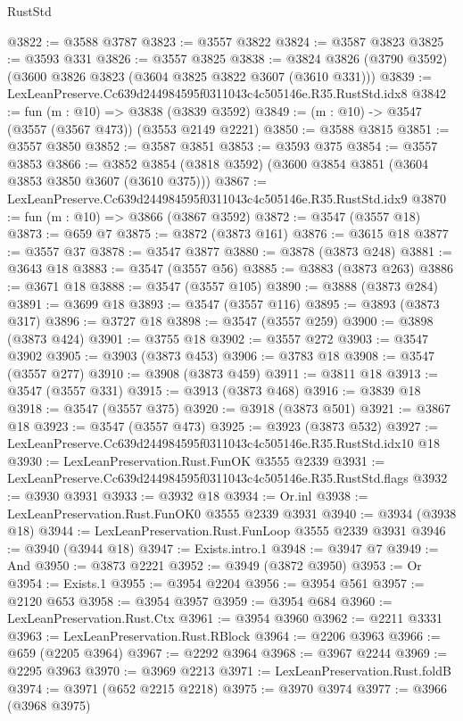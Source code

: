 \begin{lexlean}{RustStd}
\begin{coremodule}
@3822 := @3588 @3787
@3823 := @3557 @3822
@3824 := @3587 @3823
@3825 := @3593 @331
@3826 := @3557 @3825
@3838 := @3824 @3826 (@3790 @3592) (@3600 @3826 @3823 (@3604 @3825 @3822 @3607 (@3610 @331)))
@3839 := LexLeanPreserve.Cc639d244984595f0311043c4c505146e.R35.RustStd.idx8
@3842 := fun (m : @10) => @3838 (@3839 @3592)
@3849 := (m : @10) -> @3547 (@3557 (@3567 @473)) (@3553 @2149 @2221)
@3850 := @3588 @3815
@3851 := @3557 @3850
@3852 := @3587 @3851
@3853 := @3593 @375
@3854 := @3557 @3853
@3866 := @3852 @3854 (@3818 @3592) (@3600 @3854 @3851 (@3604 @3853 @3850 @3607 (@3610 @375)))
@3867 := LexLeanPreserve.Cc639d244984595f0311043c4c505146e.R35.RustStd.idx9
@3870 := fun (m : @10) => @3866 (@3867 @3592)
@3872 := @3547 (@3557 @18)
@3873 := @659 @7
@3875 := @3872 (@3873 @161)
@3876 := @3615 @18
@3877 := @3557 @37
@3878 := @3547 @3877
@3880 := @3878 (@3873 @248)
@3881 := @3643 @18
@3883 := @3547 (@3557 @56)
@3885 := @3883 (@3873 @263)
@3886 := @3671 @18
@3888 := @3547 (@3557 @105)
@3890 := @3888 (@3873 @284)
@3891 := @3699 @18
@3893 := @3547 (@3557 @116)
@3895 := @3893 (@3873 @317)
@3896 := @3727 @18
@3898 := @3547 (@3557 @259)
@3900 := @3898 (@3873 @424)
@3901 := @3755 @18
@3902 := @3557 @272
@3903 := @3547 @3902
@3905 := @3903 (@3873 @453)
@3906 := @3783 @18
@3908 := @3547 (@3557 @277)
@3910 := @3908 (@3873 @459)
@3911 := @3811 @18
@3913 := @3547 (@3557 @331)
@3915 := @3913 (@3873 @468)
@3916 := @3839 @18
@3918 := @3547 (@3557 @375)
@3920 := @3918 (@3873 @501)
@3921 := @3867 @18
@3923 := @3547 (@3557 @473)
@3925 := @3923 (@3873 @532)
@3927 := LexLeanPreserve.Cc639d244984595f0311043c4c505146e.R35.RustStd.idx10 @18
@3930 := LexLeanPreservation.Rust.FunOK @3555 @2339
@3931 := LexLeanPreserve.Cc639d244984595f0311043c4c505146e.R35.RustStd.flags
@3932 := @3930 @3931
@3933 := @3932 @18
@3934 := Or.inl
@3938 := LexLeanPreservation.Rust.FunOK0 @3555 @2339 @3931
@3940 := @3934 (@3938 @18)
@3944 := LexLeanPreservation.Rust.FunLoop @3555 @2339 @3931
@3946 := @3940 (@3944 @18)
@3947 := Exists.intro.{1}
@3948 := @3947 @7
@3949 := And
@3950 := @3873 @2221
@3952 := @3949 (@3872 @3950)
@3953 := Or
@3954 := Exists.{1}
@3955 := @3954 @2204
@3956 := @3954 @561
@3957 := @2120 @653
@3958 := @3954 @3957
@3959 := @3954 @684
@3960 := LexLeanPreservation.Rust.Ctx
@3961 := @3954 @3960
@3962 := @2211 @3331
@3963 := LexLeanPreservation.Rust.RBlock
@3964 := @2206 @3963
@3966 := @659 (@2205 @3964)
@3967 := @2292 @3964
@3968 := @3967 @2244
@3969 := @2295 @3963
@3970 := @3969 @2213
@3971 := LexLeanPreservation.Rust.foldB
@3974 := @3971 (@652 @2215 @2218)
@3975 := @3970 @3974
@3977 := @3966 (@3968 @3975)

\end{coremodule}
\end{lexlean}
